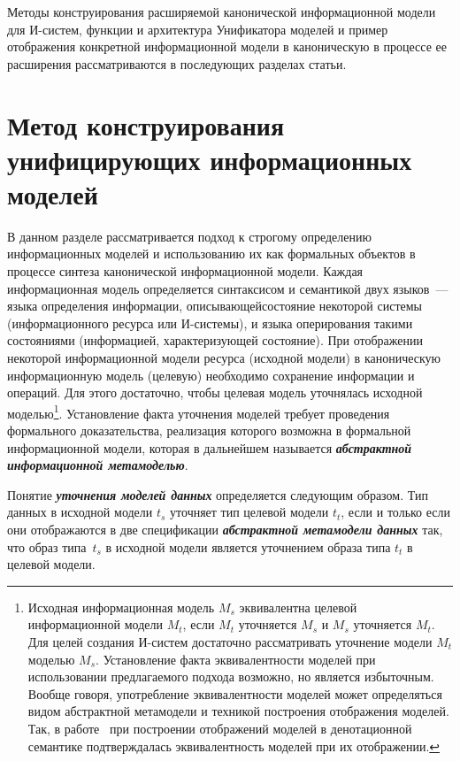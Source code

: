 \begin{multicols}{2}
Методы конструирования расширяемой канонической информационной модели
для И-систем, функции и архитектура Унификатора моделей и пример
отображения конкретной информационной модели в каноническую в процессе
ее расширения рассматриваются в последующих разделах статьи.

\section{Метод конструирования унифицирующих информационных моделей}

В данном разделе рассматривается подход к строгому определению
информационных моделей и использованию их как формальных объектов в
процессе синтеза канонической информационной модели. Каждая
информационная модель определяется синтаксисом и семантикой двух
языков~--- языка определения информации, описывающей\linebreak состояние
некоторой системы (информационного ресурса или И-системы), и языка
оперирования такими состояниями (информацией, характеризующей
состояние). При отображении некоторой информационной модели ресурса
(исходной модели) в каноническую информационную модель (целевую)
необходимо сохранение информации и операций. Для этого достаточно,
чтобы целевая модель уточнялась исходной
моделью\footnote{Исходная информационная модель $M_s$ эквивалентна целевой информационной модели
$M_t$, если $M_t$ уточняется $M_s$ и $M_s$ уточняется $M_t$. Для
целей создания И-систем достаточно рассматривать уточнение модели
$M_t$ моделью $M_s$. Установление факта эквивалентности моделей при
использовании предлагаемого подхода возможно, но является избыточным.
Вообще говоря, употребление эквивалентности моделей может определяться
видом абстрактной метамодели и техникой построения отображения
моделей. Так, в работе~\cite{Ka90}
при построении отображений моделей в денотационной
семантике подтверждалась эквивалентность моделей при их отображении.}.
Установление факта уточнения моделей требует проведения формального
доказательства, реализация которого возможна в формальной
информационной модели, которая в дальнейшем называется
{\bfseries\textit{абстрактной информационной метамоделью}}.

Понятие {\bfseries\textit{уточнения моделей данных}} определяется следующим
образом.
Тип данных в исходной
модели $t_s$ уточняет тип целевой модели $t_t$, если и только если
они отображаются в две спецификации {\bfseries\textit{абстрактной метамодели
данных}} так, что образ типа~$t_s$ в исходной модели является уточнением
образа типа $t_t$ в целевой модели.


\end{multicols}
